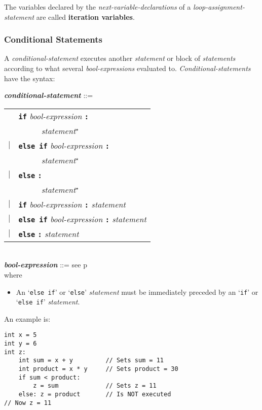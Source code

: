 \documentclass[12pt]{article}
\newcommand{\TT}[1]{{\tt \bfseries #1}}
\newcommand{\STAR}{{\Large $^\star$}}
\newcommand{\ttkey}[1]{{\tt \bfseries #1}}
\newcommand{\emkey}[1]{{\em \bfseries #1}}
\newcommand{\skey}[2]{{\rm \bfseries #1#2}}
\newcommand{\pagref}[1]{p\pageref{#1}}
\newenvironment{indpar}[1][0.3in]%
	{\begin{list}{}%
		     {\setlength{\itemsep}{0in}%
		      \setlength{\topsep}{0in}%
		      \setlength{\parsep}{1ex}%
		      \setlength{\labelwidth}{#1}%
		      \setlength{\leftmargin}{#1}%
		      \addtolength{\leftmargin}{\labelsep}}%
	 \item}%
	{\end{list}}
\begin{document}
The variables declared by the {\em next-variable-declarations}
of a {\em loop-assignment-statement} are called \skey{iteration variable}s.

\subsubsection{Conditional Statements}
\label{CONDITIONAL-STATEMENTS}

A {\em conditional-statement} executes another {\em statement}
or block of {\em statements} according to what several
{\em bool-expressions} evaluated to.
{\em Conditional-statements} have the syntax:

\begin{indpar}
\emkey{conditional-statement} ::= \\
\hspace*{0.5in}\begin{tabular}[t]{rl}
        & \ttkey{if} {\em bool-expression} \TT{:} \\
	& ~~~~~ {\em statement}\STAR{} \\
    $|$ & \ttkey{else if} {\em bool-expression} \TT{:} \\
	& ~~~~~ {\em statement}\STAR{} \\
    $|$ & \ttkey{else} \TT{:} \\
	& ~~~~~ {\em statement}\STAR{} \\
    $|$ & \ttkey{if} {\em bool-expression} \TT{:} {\em statement} \\
    $|$ & \ttkey{else if} {\em bool-expression} \TT{:} {\em statement} \\
    $|$ & \ttkey{else} \TT{:} {\em statement} \\
	\end{tabular}
\\[0.5ex]
\emkey{bool-expression} ::= see \pagref{BOOL-EXPRESSION}
\\[1ex]
where
\begin{itemize}
\item An `{\tt else if}' or `{\tt else}' {\em statement} must be immediately
preceded by an `{\tt if}' or `{\tt else if}' {\em statement}.
\end{itemize}
\end{indpar}

An example is:
\begin{indpar}\begin{verbatim}
int x = 5
int y = 6
int z:
    int sum = x + y         // Sets sum = 11
    int product = x * y     // Sets product = 30
    if sum < product:
        z = sum             // Sets z = 11
    else: z = product       // Is NOT executed
// Now z = 11
\end{verbatim}\end{indpar}
\end{document}
